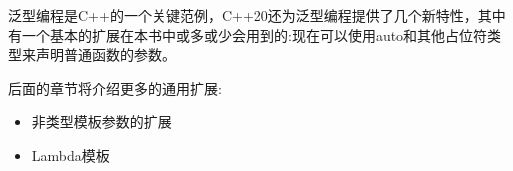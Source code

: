 泛型编程是C++的一个关键范例，C++20还为泛型编程提供了几个新特性，其中有一个基本的扩展在本书中或多或少会用到的:现在可以使用auto和其他占位符类型来声明普通函数的参数。

后面的章节将介绍更多的通用扩展:

\begin{itemize}
\item
非类型模板参数的扩展

\item
Lambda模板
\end{itemize}